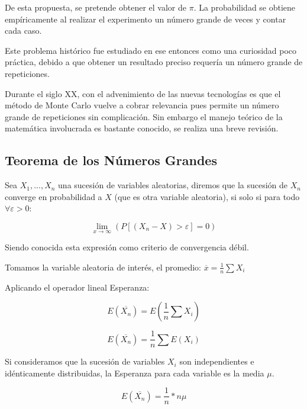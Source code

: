 \documentclass{rbf}
\begin{document}
De esta propuesta, se pretende obtener el valor de $\pi$. La probabilidad se obtiene empíricamente al realizar el experimento un número grande de veces y contar cada caso.

Este problema histórico fue estudiado en ese entonces como una curiosidad poco práctica, debido a que obtener un resultado preciso requería un número grande de repeticiones. 

Durante el siglo XX, con el advenimiento de las nuevas tecnologías es que el método de Monte Carlo vuelve a cobrar relevancia pues permite un número grande de repeticiones sin complicación. Sin embargo el manejo teórico de la matemática involucrada es bastante conocido, se realiza una breve revisión.

\subsection{Teorema de los Números Grandes}

Sea $X_1,..., X_n$ una sucesión de variables aleatorias, diremos que la sucesión de ${X_n}$ converge en probabilidad a $X$ (que es otra variable aleatoria), si solo si para todo $\forall \varepsilon >0$:

\begin{equation}
   \displaystyle \lim_{x \to \infty}(P[(X_n - X)>\varepsilon]=0)
\end{equation}

Siendo conocida esta expresión como criterio de convergencia débil. 

Tomamos la variable aleatoria de interés, el promedio: $\overline{x}=\frac{1}{n}\sum X_i$

Aplicando el operador lineal Esperanza:

\begin{equation}
  \displaystyle  E(\overline{X_n})=E(\frac{1}{n} \sum X_i)
\end{equation}

\begin{equation}
  \displaystyle  E(\overline{X_n})=\frac{1}{n} \sum E(X_i)
\end{equation}

Si consideramos que la sucesión de variables $X_i$ son independientes e idénticamente distribuidas, la Esperanza para cada variable es la media $\mu$.

\begin{equation}
  \displaystyle  E(\overline{X_n})=\frac{1}{n} *n\mu
\end{equation}
\end{document}
